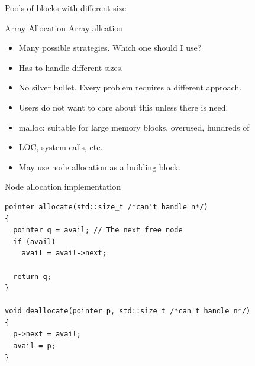 \documentclass[10pt,aspectratio=169]{beamer}
\def\mbo{\node[style=mbo]}
\def\lbd{\node[style=lbd]}
\def\marrow{\draw[style=marrow]}
\begin{document}
\begin{frame}[t]{Pools of blocks with different size}
\end{frame}


\begin{frame}[fragile]{Array Allocation}
Array allcation
\begin{itemize}
\item Many possible strategies. Which one should I use?
\item Has to handle different sizes.
\item No silver bullet. Every problem requires a different approach.
\item Users do not want to care about this unless there is need.
\item malloc: suitable for large memory blocks, overused, hundreds of
\item LOC, system calls, etc.
\item May use node allocation as a building block.
\end{itemize}

\end{frame}

\begin{frame}[fragile]{Node allocation implementation}

\begin{lstlisting}
pointer allocate(std::size_t /*can't handle n*/)
{
  pointer q = avail; // The next free node
  if (avail)
    avail = avail->next;

  return q;
}

void deallocate(pointer p, std::size_t /*can't handle n*/)
{
  p->next = avail;
  avail = p;
}

\end{lstlisting}

\end{frame}
\end{document}
